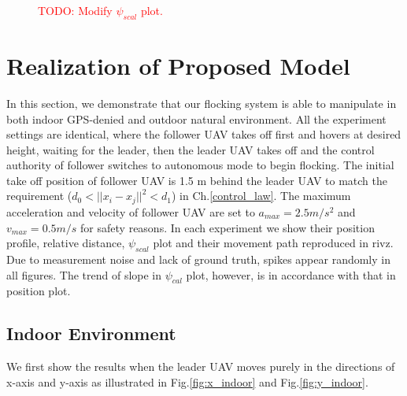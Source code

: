 \begin{figure}[H]
  \caption{\textcolor{red}{TODO: Modify $\psi_{scal}$ plot.}}\label{fig:track_plot}
\end{figure}

\section{Realization of Proposed Model}

In this section, we demonstrate that our flocking system is able to manipulate in both indoor GPS-denied and outdoor natural environment. All the experiment settings are identical, where the follower UAV takes off first and hovers at desired height, waiting for the leader, then the leader UAV takes off and the control authority of follower switches to autonomous mode to begin flocking. The initial take off position of follower UAV is 1.5 m behind the leader UAV to match the requirement ($d_0<||x_i-x_j||^2<d_1$) in Ch.\ref{control_law}. The maximum acceleration and velocity of follower UAV are set to $a_{max}=2.5 m/s^2$ and $v_{max}=0.5 m/s$ for safety reasons. In each experiment we show their position profile, relative distance, $\psi_{scal}$ plot and their movement path reproduced in rivz. Due to measurement noise and lack of ground truth, spikes appear randomly in all figures. The trend of slope in $\psi_{cal}$ plot, however, is in accordance with that in position plot.

\subsection{Indoor Environment}

We first show the results when the leader UAV moves purely in the directions of x-axis and y-axis as illustrated in Fig.\ref{fig:x_indoor} and Fig.\ref{fig:y_indoor}.

